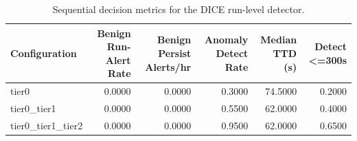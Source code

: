 \begin{table}[t]
\centering
\caption{Sequential decision metrics for the DICE run-level detector.}
\label{tab:dice_sequential_metrics}
\footnotesize
\begin{tabular}{lrrrrr}
\toprule
Configuration & Benign Run-Alert Rate & Benign Persist Alerts/hr & Anomaly Detect Rate & Median TTD (s) & Detect <=300s \\
\midrule
tier0 & 0.0000 & 0.0000 & 0.3000 & 74.5000 & 0.2000 \\
tier0_tier1 & 0.0000 & 0.0000 & 0.5500 & 62.0000 & 0.4000 \\
tier0_tier1_tier2 & 0.0000 & 0.0000 & 0.9500 & 62.0000 & 0.6500 \\
\bottomrule
\end{tabular}

\end{table}
